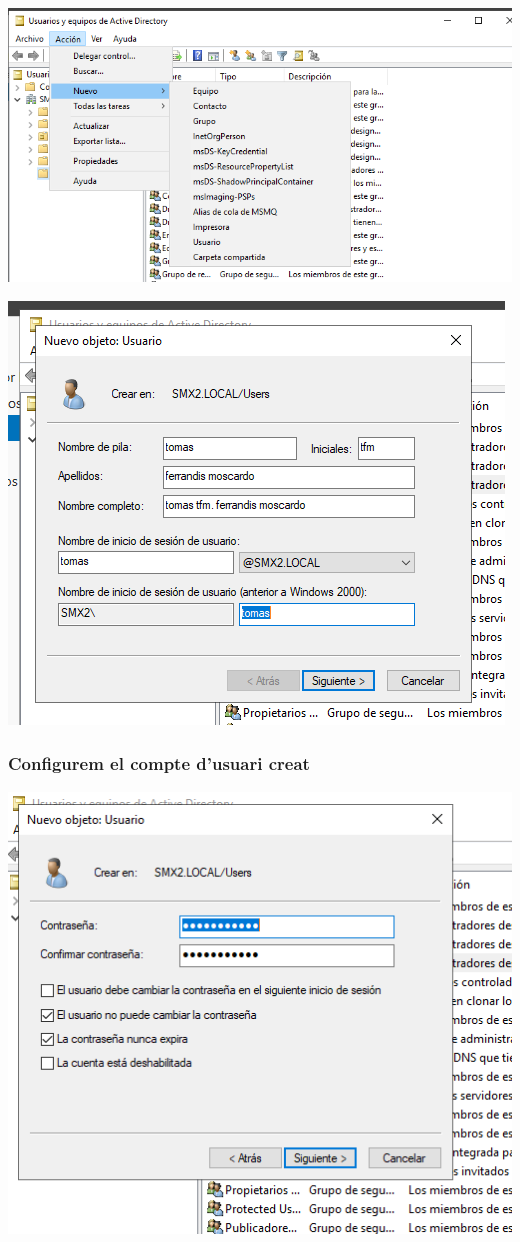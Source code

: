 \documentclass[
  a4paper,
]{article}
\begin{document}
\includegraphics{png/usuaris3.png}

\includegraphics{png/usuaris4.png}

\subsubsection{Configurem el compte d'usuari
creat}\label{configurem-el-compte-dusuari-creat}

\includegraphics{png/usuaris5.png}
\end{document}
